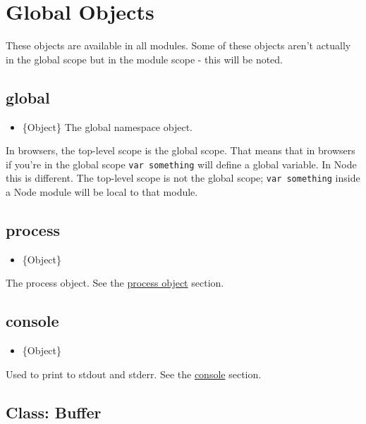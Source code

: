 \section{Global Objects}\label{global-objects}

These objects are available in all modules. Some of these objects aren't
actually in the global scope but in the module scope - this will be
noted.

\subsection{global}\label{global}

\begin{itemize}
\itemsep1pt\parskip0pt
\item
  \{Object\} The global namespace object.
\end{itemize}

In browsers, the top-level scope is the global scope. That means that in
browsers if you're in the global scope \texttt{var something} will
define a global variable. In Node this is different. The top-level scope
is not the global scope; \texttt{var something} inside a Node module
will be local to that module.

\subsection{process}\label{process}

\begin{itemize}
\itemsep1pt\parskip0pt
\item
  \{Object\}
\end{itemize}

The process object. See the \href{process.html\#process_process}{process
object} section.

\subsection{console}\label{console}

\begin{itemize}
\itemsep1pt\parskip0pt
\item
  \{Object\}
\end{itemize}

Used to print to stdout and stderr. See the \href{console.html}{console}
section.

\subsection{Class: Buffer}\label{class-buffer}

